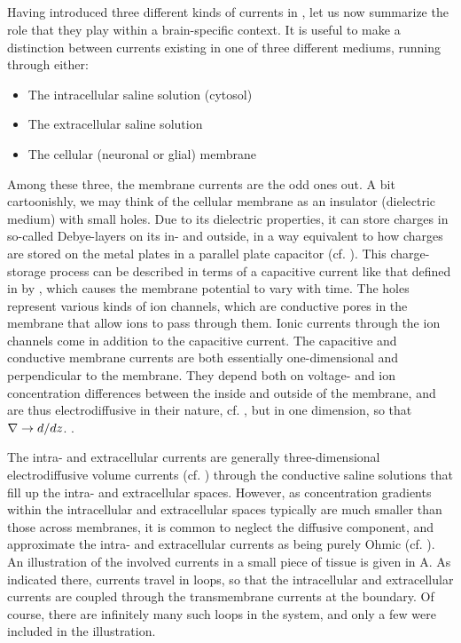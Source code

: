 \subsection{}
\label{Basics:braincurrents}
Having introduced three different kinds of currents in , let us now summarize the role that they play within a brain-specific context. It is useful to make a distinction between currents existing in one of three different mediums, running through either: 
\begin{itemize}
\item The intracellular saline solution (cytosol)
\item The extracellular saline solution
\item The cellular (neuronal or glial) membrane
\end{itemize}

Among these three, the membrane currents are the odd ones out. A bit cartoonishly, we may think of the cellular membrane as an insulator (dielectric medium) with small holes. Due to its dielectric properties, it can store charges in so-called Debye-layers on its in- and outside, in a way equivalent to how charges are stored on the metal plates in a parallel plate capacitor (cf. ). This charge-storage process can be described in terms of a capacitive current like that defined in by , which causes the membrane potential to vary with time. The holes represent various kinds of ion channels, which are conductive pores in the membrane that allow ions to pass through them. Ionic currents through the ion channels come in addition to the capacitive current. The capacitive and conductive membrane currents are both essentially one-dimensional and perpendicular to the membrane. They depend both on voltage- and ion concentration differences between the inside and outside of the membrane, and are thus electrodiffusive in their nature, cf. , but in one dimension, so that ${\bf \nabla} \rightarrow d/dz$. 
.

The intra- and extracellular currents are generally three-dimensional electrodiffusive volume currents (cf. ) through the conductive saline solutions that fill up the intra- and extracellular spaces. However, as concentration gradients within the intracellular and extracellular spaces typically are much smaller than those across membranes, it is common to neglect the diffusive component, and approximate the intra- and extracellular currents as being purely Ohmic (cf. ). An illustration of the involved currents in a small piece of tissue is given in A. As indicated there, currents travel in loops, so that the intracellular and extracellular currents are coupled through the transmembrane currents at the  boundary. Of course, there are infinitely many such loops in the system, and only a few were included in the illustration. 

